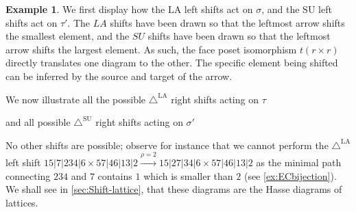 \documentclass{amsart}
\theoremstyle{definition}
\newtheorem{example}[theorem]{Example}
\newcommand{\SU}{\mathrm{SU}}
\newcommand{\LA}{\mathrm{LA}}
\newcommand{\SUD}{\triangle^{\mathrm{SU}}}
\newcommand{\LAD}{\triangle^{\mathrm{LA}}}
\begin{document}
\begin{example}
We first display how the $\LA$ left shifts act on $\sigma$, and the $\SU$ left shifts act on $\tau'$.
The $LA$ shifts have been drawn so that the leftmost arrow shifts the smallest element, and the $SU$ shifts have been drawn so that the leftmost arrow shifts the largest element.
As such, the face poset isomorphism $t(r\times r)$ directly translates one diagram to the other.
The specific element being shifted can be inferred by the source and target of the arrow.
\begin{center}
{\small
{}
}
\end{center}
We now illustrate all the possible $\LAD$ right shifts acting on $\tau$
\begin{center}
\end{center}
and all possible $\SUD$ right shifts acting on $\sigma'$
\begin{center}
\end{center}
No other shifts are possible; observe for instance that we cannot perform the $\LAD$ left shift $15|7|234|6 \times 57|46|13|2 \xrightarrow{\rho=2} 15|27|34|6 \times 57|46|13|2$ as the minimal path connecting $234$ and $7$ contains $1$ which is smaller than $2$ (see \cref{ex:ECbijection}).
We shall see in \cref{sec:Shift-lattice}, that these diagrams are the Hasse diagrams of lattices.
\end{example}
\end{document}
